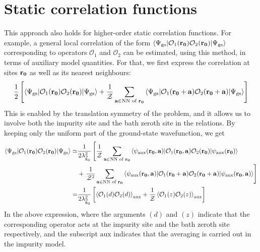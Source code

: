 \documentclass[reprint,hidelinks]{revtex4-2}
\begin{document}
\section{Static correlation functions}
This approach also holds for higher-order static correlation functions. For example, a general local correlation of the form \(\braket{\Psi_\text{gs} | \mathcal{O}_1({\bf r_0}) \mathcal{O}_2({\bf r_0}) | \Psi_\text{gs}}\) corresponding to operators \(\mathcal{O}_1\) and \(\mathcal{O}_2\) can be estimated, using this method, in terms of auxiliary model quantities. For that, we first express the correlation at sites \({\bf r_0}\) as well as its nearest neighbours: 
\begin{equation}\begin{aligned}
	\frac{1}{2}\left[\braket{\Psi_\text{gs} | \mathcal{O}_1({\bf r_0}) \mathcal{O}_2({\bf r_0}) | \Psi_\text{gs}} + \frac{1}{\mathcal{Z}}\sum_{{\bf a} \in \text{NN of }{\bf r_0}}\braket{\Psi_\text{gs} | \mathcal{O}_1({\bf r_0} + {\bf a}) \mathcal{O}_2({\bf r_0} + {\bf a}) | \Psi_\text{gs}}\right]
\end{aligned}\end{equation}
This is enabled by the translation symmetry of the problem, and it allows us to involve both the impurity site and the bath zeroth site in the relations. By keeping only the uniform part of the ground-state wavefunction, we get
\begin{equation}\begin{aligned}
	\label{local_correlation}
	\braket{\Psi_\text{gs} | \mathcal{O}_1({\bf r_0}) \mathcal{O}_2({\bf r_0}) | \Psi_\text{gs}} \simeq& \frac{1}{2\lambda_{\vec k_0}^2}\left[\frac{1}{\mathcal{Z} }\sum_{{\bf a} \in \text{NN of }{\bf r_0}}\braket{\psi_\text{aux}({\bf r_0}, {\bf a}) | \mathcal{O}_1({\bf r_0}, {\bf a}) \mathcal{O}_2({\bf r_0}) | \psi_\text{aux}({\bf r_0})} \right. \\
													   &+ \left.\frac{1}{\mathcal{Z}^2}\sum_{{\bf a} \in \text{NN of }{\bf r_0}}\braket{\psi_\text{aux}({\bf r_0}, {\bf a}) | \mathcal{O}_1({\bf r_0} + {\bf a}) \mathcal{O}_2({\bf r_0} + {\bf a}) | \psi_\text{aux}({\bf r_0}, {\bf a})}\right]\\
	=& \frac{1}{2\lambda_{\vec k_0}^2}\left[\braket{\mathcal{O}_1(d) \mathcal{O}_2(d)}_\text{aux} + \frac{1}{\mathcal{Z}}\braket{\mathcal{O}_1(z) \mathcal{O}_2(z)}_\text{aux}\right]
\end{aligned}\end{equation}
In the above expression, where the arguments \((d)\) and \((z)\) indicate that the corresponding operator acts at the impurity site and the bath zeroth site respectively, and the subscript \(\text{aux}\) indicates that the averaging is carried out in the impurity model.
\end{document}
